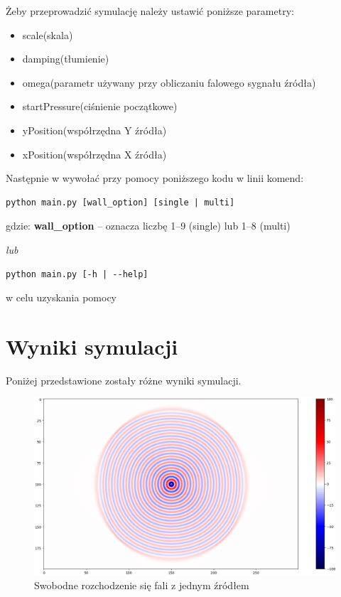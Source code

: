 \documentclass[a4paper, 12pt]{article}
\begin{document}
Żeby przeprowadzić symulację należy ustawić poniższe parametry: 
\begin{itemize}
\item scale(skala)
\item damping(tłumienie)
\item omega(parametr używany przy obliczaniu falowego sygnału źródła)
\item startPressure(ciśnienie początkowe)
\item yPosition(współrzędna Y źródła)
\item xPosition(współrzędna X źródła)\\
\end{itemize}

Następnie w wywołać przy pomocy poniższego kodu w linii komend: \\

\begin{verbatim}
python main.py [wall_option] [single | multi]
\end{verbatim}

\hspace{1.5cm} gdzie: \textbf{wall\_option} -- oznacza liczbę 1--9 (single) lub 1--8 (multi)

\begin{center}
\emph{lub}
\end{center}

\begin{verbatim}
python main.py [-h | --help]
\end{verbatim}

\hspace{1.5cm} w celu uzyskania pomocy \\



\section{Wyniki symulacji}

Poniżej przedstawione zostały różne wyniki symulacji.

\newpage


\begin{figure}
\includegraphics[scale=0.43]{no1.png}
\caption{Swobodne rozchodzenie się fali z jednym źródłem}
\end{figure}
\end{document}
